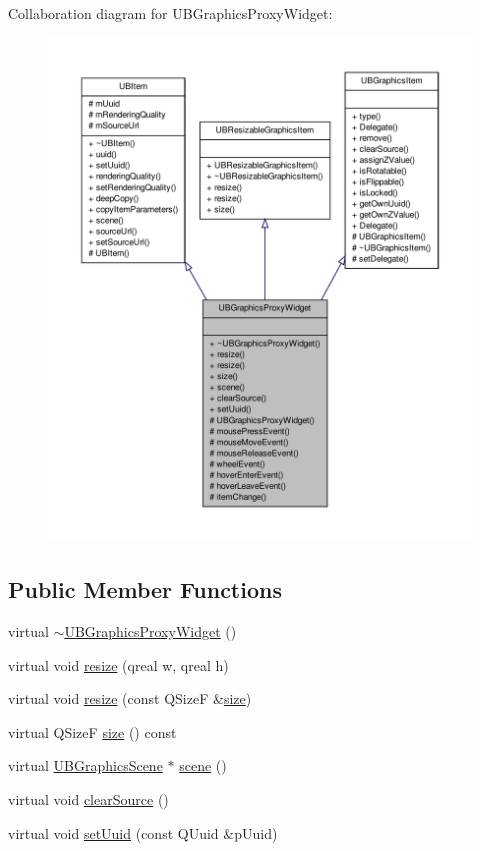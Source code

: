Collaboration diagram for U\-B\-Graphics\-Proxy\-Widget\-:
\nopagebreak
\begin{figure}[H]
\begin{center}
\leavevmode
\includegraphics[width=350pt]{d1/dca/class_u_b_graphics_proxy_widget__coll__graph}
\end{center}
\end{figure}
\subsection*{Public Member Functions}
\begin{DoxyCompactItemize}
\item 
virtual \hyperlink{class_u_b_graphics_proxy_widget_a168bfbe6300133b85dd25ec3eeb18985}{$\sim$\-U\-B\-Graphics\-Proxy\-Widget} ()
\item 
virtual void \hyperlink{class_u_b_graphics_proxy_widget_a6aca497aebf0c51cf21be6cdb5422817}{resize} (qreal w, qreal h)
\item 
virtual void \hyperlink{class_u_b_graphics_proxy_widget_a5b8c89e2c816e8a98381fa08788047a8}{resize} (const Q\-Size\-F \&\hyperlink{class_u_b_graphics_proxy_widget_aa4c41dd8a1864c2b09074c4d1f65a7d7}{size})
\item 
virtual Q\-Size\-F \hyperlink{class_u_b_graphics_proxy_widget_aa4c41dd8a1864c2b09074c4d1f65a7d7}{size} () const 
\item 
virtual \hyperlink{class_u_b_graphics_scene}{U\-B\-Graphics\-Scene} $\ast$ \hyperlink{class_u_b_graphics_proxy_widget_af75c8bf52df5e6ed091d4b4277fbe8b8}{scene} ()
\item 
virtual void \hyperlink{class_u_b_graphics_proxy_widget_a04cb6773a4bd44074cb3dad4a6dca2bc}{clear\-Source} ()
\item 
virtual void \hyperlink{class_u_b_graphics_proxy_widget_ab0828daa6cded97da73d0e04e1f1891b}{set\-Uuid} (const Q\-Uuid \&p\-Uuid)
\end{DoxyCompactItemize}

